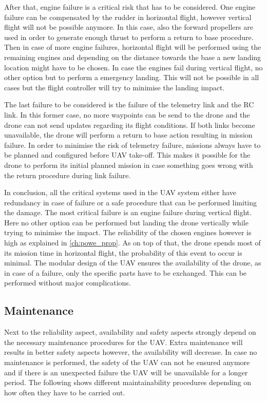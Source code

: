 After that, engine failure is a critical risk that has to be considered. One engine failure can be compensated by the rudder in horizontal flight, however vertical flight will not be possible anymore. In this case, also the forward propellers are used in order to generate enough thrust to perform a return to base procedure. Then in case of more engine failures, horizontal flight will be performed using the remaining engines and depending on the distance towards the base a new landing location might have to be chosen. In case the engines fail during vertical flight, no other option but to perform a emergency landing. This will not be possible in all cases but the flight controller will try to minimise the landing impact. 

The last failure to be considered is the failure of the telemetry link and the RC link. In this former case, no more waypoints can be send to the drone and the drone can not send updates regarding its flight conditions. If both links become unavailable, the drone will perform a return to base action resulting in mission failure. In order to minimise the risk of telemetry failure, missions always have to be planned and configured before UAV take-off. This makes it possible for the drone to perform its initial planned mission in case something goes wrong with the return procedure during link failure. 

In conclusion, all the critical systems used in the UAV system either have redundancy in case of failure or a safe procedure that can be performed limiting the damage. The most critical failure is an engine failure during vertical flight. Here no other option can be performed but landing the drone vertically while trying to minimise the impact. The reliability of the chosen engines however is high as explained in \autoref{ch:powe_prop}. As on top of that, the drone spends most of its mission time in horizontal flight, the probability of this event to occur is minimal. The modular design of the UAV ensures the availability of the drone, as in case of a failure, only the specific parts have to be exchanged. This can be performed without major complications. 

\subsection{Maintenance}

Next to the reliability aspect, availability and safety aspects strongly depend on the necessary maintenance procedures for the UAV. Extra maintenance will results in better safety aspects however, the availability will decrease. In case no maintenance is performed, the safety of the UAV can not be ensured anymore and if there is an unexpected failure the UAV will be unavailable for a longer period. The following shows different maintainability procedures depending on how often they have to be carried out. 
\newline


